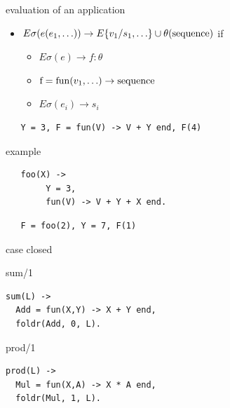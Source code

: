 \begin{frame}[fragile]{evaluation of an application}

  \begin{itemize}
   \pause\item $E\sigma(e(e_1, \ldots)) \rightarrow E\{v_1/s_1, \ldots\}\cup\theta({\rm sequence} )$ if
    \begin{itemize}        
           \pause\item $E\sigma(e) \rightarrow f:\theta$
           \pause\item ${\rm f} = {\rm fun}(v_1, \ldots) \rightarrow  {\rm sequence}$ 
           \pause\item $E\sigma(e_i) \rightarrow s_i$ 
    \end{itemize} 
  \end{itemize}

\pause\vspace{20pt}

\begin{verbatim}
   Y = 3, F = fun(V) -> V + Y end, F(4)
\end{verbatim}

\end{frame}
 
\begin{frame}[fragile]{example}

\begin{verbatim}
   foo(X) -> 
        Y = 3, 
        fun(V) -> V + Y + X end.
\end{verbatim}
\pause\vspace{20pt}

\begin{verbatim}
   F = foo(2), Y = 7, F(1)
\end{verbatim}
\end{frame}

\begin{frame}[fragile]{case closed}

\pause
     \begin{block}{sum/1}
       \begin{verbatim}
sum(L) -> 
  Add = fun(X,Y) -> X + Y end,
  foldr(Add, 0, L).
       \end{verbatim}
     \end{block}
   \pause
     \begin{block}{prod/1}
       \begin{verbatim}
prod(L) -> 
  Mul = fun(X,A) -> X * A end,
  foldr(Mul, 1, L).
       \end{verbatim}
\vfill
     \end{block}

\end{frame}


